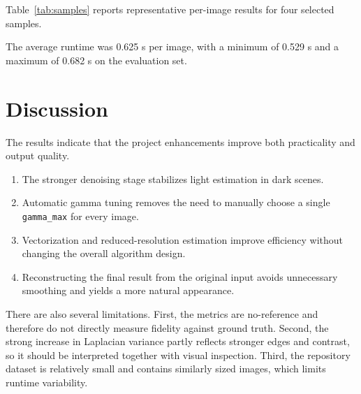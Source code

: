 \documentclass[conference]{IEEEtran}
\begin{document}
Table~\ref{tab:samples} reports representative per-image results for four selected samples.

\begin{table}[t]
    \caption{Representative Sample Results}
    \label{tab:samples}
    \centering
\end{table}

The average runtime was 0.625 s per image, with a minimum of 0.529 s and a maximum of 0.682 s on the evaluation set.

\section{Discussion}
The results indicate that the project enhancements improve both practicality and output quality.

\begin{enumerate}
\item The stronger denoising stage stabilizes light estimation in dark scenes.
\item Automatic gamma tuning removes the need to manually choose a single \texttt{gamma\_max} for every image.
\item Vectorization and reduced-resolution estimation improve efficiency without changing the overall algorithm design.
\item Reconstructing the final result from the original input avoids unnecessary smoothing and yields a more natural appearance.
\end{enumerate}

There are also several limitations. First, the metrics are no-reference and therefore do not directly measure fidelity against ground truth. Second, the strong increase in Laplacian variance partly reflects stronger edges and contrast, so it should be interpreted together with visual inspection. Third, the repository dataset is relatively small and contains similarly sized images, which limits runtime variability.
\end{document}
